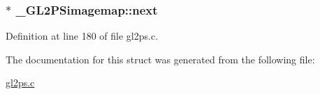 \subsubsection[{next}]{$\ast$ \+\_\+\+G\+L2\+P\+Simagemap\+::next}\label{struct___g_l2_p_simagemap_aa409b7a2920f3cf3092845d05786831c}


Definition at line 180 of file gl2ps.\+c.



The documentation for this struct was generated from the following file\+:\begin{DoxyCompactItemize}
\item 
\hyperlink{gl2ps_8c}{gl2ps.\+c}\end{DoxyCompactItemize}
